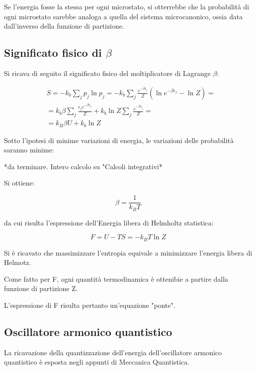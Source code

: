 \documentclass{article}
\begin{document}
Se l'energia fosse la stessa per ogni microstato, si otterrebbe che la probabilità di ogni microstato sarebbe analoga a quella del sistema microcanonico, ossia data dall'inverso della funzione di partizione.

\subsection{Significato fisico di $\beta$}
Si ricava di seguito il significato fisico del moltiplicatore di Lagrange $\beta$:

\begin{equation}
    \begin{aligned}
         & S=-k_b\sum_{j}p_j\ln{p_j}=-k_b\sum_{j}\frac{e^{-\beta \epsilon_j}}{Z}(\ln{e^{-\beta \epsilon_j}}-\ln{Z})=     \\
         & =k_b\beta\sum_{j}\frac{\epsilon_j e^{-\beta \epsilon_j}}{Z}+k_b\ln{Z}\sum_{j}\frac{e^{-\beta \epsilon_j}}{Z}= \\
         & =k_B\beta U+k_b\ln{Z}
    \end{aligned}
\end{equation}

Sotto l'ipotesi di minime variazioni di energia, le variazioni delle probabilità saranno minime:

*da terminare. Intero calcolo su "Calcoli integrativi*

Si ottiene:

\begin{equation}
    \beta=\frac{1}{k_BT}
\end{equation}

da cui risulta l'espressione dell'Energia libera di Helmholtz statistica:

\begin{equation}
    F=U-TS=-k_BT\ln{Z}
\end{equation}

Si è ricavato che massimizzare l'entropia equivale a minimizzare l'energia libera di Helmotz.

Come fatto per F, ogni quantità termodinamica è ottenibie a partire dalla funzione di partizione Z.

L'espressione di F risulta pertanto un'equazione "ponte".

\subsection{Oscillatore armonico quantistico}

La ricavazione della quantizzazione dell'energia dell'oscillatore armonico quantistico è esposta negli appunti di Meccanica Quantistica.
\end{document}
